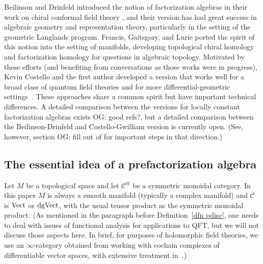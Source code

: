 \documentclass[11pt]{amsart}
\def\mc{\mathcal}
\def\owen#1{{\textcolor{violet!50!black}{OG: {#1}}}}
\begin{document}
\begin{rmk}
Beilinson and Drinfeld introduced the notion of factorization algebras in their work on chiral conformal field theory \cite{BD},
and their version has had great success in algebraic geometry and representation theory,
particularly in the setting of the geometric Langlands program.
Francis, Gaitsgory, and Lurie ported the spirit of this notion into the setting of manifolds,
developing topological chiral homology \cite{LurieHA} and factorization homology \cite{AF}
for questions in algebraic topology.
Motivated by these efforts (and benefiting from conversations as those works were in progress), 
Kevin Costello and the first author developed a version that works well for a broad class of quantum field theories and for more differential-geometric settings~\cite{CG1,CG2}.
These approaches share a common spirit but have important technical differences.
A detailed comparison between the versions for locally constant factorization algebras exists \owen{good refs?},
but a detailed comparison between the Beilinson-Drinfeld and Costello-Gwilliam version is currently open.
(See, however, section \owen{fill out } of \cite{HenKap} for important steps in that direction.)
\end{rmk}

\subsection{The essential idea of a prefactorization algebra}

Let $M$ be a topological space and let $\mc{C}^\otimes$ be a symmetric monoidal category. 
In this paper $M$ is always a smooth manifold (typically a complex manifold) and $\mc{C}$ is ${\rm Vect}$ or ${\rm dgVect}$, with the usual tensor product as the symmetric monoidal product.
(As mentioned in the paragraph before Definition~\ref{dfn pdisc}, one needs to deal with issues of functional analysis for applications to QFT, but we will not discuss those aspects here.
In brief, for purposes of holomorphic field theories, we use an $\infty$-category obtained from working with cochain complexes of differentiable vector spaces, with extensive treatment in~\cite{CG1}.)
\end{document}
